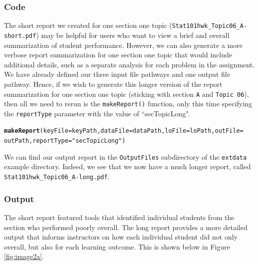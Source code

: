 \documentclass{article}\usepackage[]{graphicx}\usepackage[]{color}
\makeatletter
\newcommand{\hlstr}[1]{\textcolor[rgb]{0.192,0.494,0.8}{#1}}%
\newcommand{\hlstd}[1]{\textcolor[rgb]{0.345,0.345,0.345}{#1}}%
\newcommand{\hlkwc}[1]{\textcolor[rgb]{0.333,0.667,0.333}{#1}}%
\newcommand{\hlkwd}[1]{\textcolor[rgb]{0.737,0.353,0.396}{\textbf{#1}}}%
\newenvironment{kframe}{%
 \def\at@end@of@kframe{}%
 \ifinner\ifhmode%
  \def\at@end@of@kframe{\end{minipage}}%
  \begin{minipage}{\columnwidth}%
 \fi\fi%
 \def\FrameCommand##1{\hskip\@totalleftmargin \hskip-\fboxsep
 \colorbox{shadecolor}{##1}\hskip-\fboxsep
     \hskip-\linewidth \hskip-\@totalleftmargin \hskip\columnwidth}%
 \MakeFramed {\advance\hsize-\width
   \@totalleftmargin\z@ \linewidth\hsize
   \@setminipage}}%
 {\par\unskip\endMakeFramed%
 \at@end@of@kframe}
\newenvironment{knitrout}{}{} %
\numberwithin{equation}{section} %
\makeatother
\begin{document}
\subsubsection{Code}

The short report we created for one section one topic (\texttt{Stat101hwk\_Topic06\_A-short.pdf}) may be helpful for users who want to view a brief and overall summarization of student performance. However, we can also generate a more verbose report summarization for one section one topic that would include additional details, such as a separate analysis for each problem in the assignment. We have already defined our three input file pathways and one output file pathway. Hence, if we wish to generate this longer version of the report summarization for one section one topic (sticking with section \texttt{A} and \texttt{Topic 06}), then all we need to rerun is the \texttt{makeReport()} function, only this time specifying the \texttt{reportType} parameter with the value of ``secTopicLong". \\

\begin{knitrout}
\color{fgcolor}\begin{kframe}
\begin{alltt}
\hlkwd{makeReport}\hlstd{(}\hlkwc{keyFile} \hlstd{= keyPath,} \hlkwc{dataFile} \hlstd{= dataPath,} \hlkwc{loFile} \hlstd{= loPath,} \hlkwc{outFile} \hlstd{=}
  \hlstd{outPath,} \hlkwc{reportType} \hlstd{=} \hlstr{"secTopicLong"}\hlstd{)}
\end{alltt}
\end{kframe}
\end{knitrout}

We can find our output report in the \texttt{OutputFiles} subdirectory of the \texttt{extdata} example directory. Indeed, we see that we now have a much longer report, called \texttt{Stat101hwk\_Topic06\_A-long.pdf}.

\subsubsection{Output}

The short report featured tools that identified individual students from the section who performed poorly overall. The long report provides a more detailed output that informs instructors on how each individual student did not only overall, but also for each learning outcome. This is shown below in Figure \ref{fig:image2a}.
\end{document}
